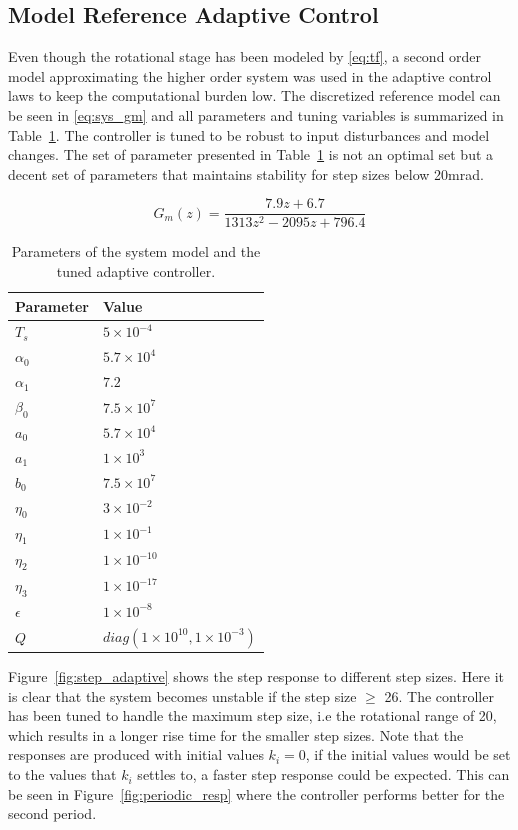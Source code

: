 \subsection{Model Reference Adaptive Control}
Even though the rotational stage has been modeled by \eqref{eq:tf}, a second order model approximating the higher order system was used in the adaptive control laws to keep the computational burden low. The discretized reference model can be seen in \eqref{eq:sys_gm} and all parameters and tuning variables is summarized in Table~\ref{tab:adaptive_param}. The controller is tuned to be robust to input disturbances and model changes. The set of parameter presented in Table~\ref{tab:adaptive_param} is not an optimal set but a decent set of parameters that maintains stability for step sizes below 20mrad.

\begin{equation}
  \label{eq:sys_gm}
  G_m(z) = \frac{7.9z + 6.7}{1313z^{2} - 2095z + 796.4}
\end{equation}

\begin{table}[h!]
  \centering
  \begin{tabular}{| l | l |}
    \hline
    Parameter & Value \\ \hline
    $T_s$ & $5 \times 10^{-4}$ \\
    $\alpha_0$ & $5.7 \times 10^{4}$ \\
    $\alpha_1$ & $7.2$ \\
    $\beta_0$ & $7.5 \times 10^{7}$ \\
    $a_0$ & $5.7 \times 10^{4}$ \\
    $a_1$ & $1 \times 10^{3}$ \\
    $b_0$ & $7.5 \times 10^{7}$ \\
    $\eta_0$ & $3 \times 10^{-2}$ \\
    $\eta_1$ & $1 \times 10^{-1}$ \\
    $\eta_2$ & $1 \times 10^{-10}$ \\
    $\eta_3$ & $1 \times 10^{-17}$ \\
    $\epsilon$ & $1 \times 10^{-8}$ \\
    $Q$ & $diag(1 \times 10^{10}, 1 \times 10^{-3})$\\
    \hline
  \end{tabular}
  \caption{\label{tab:adaptive_param} Parameters of the system model and the tuned adaptive controller.}
\end{table}

Figure~\ref{fig:step_adaptive} shows the step response to different step sizes. Here it is clear that the system becomes unstable if the step size $\geq$ \unit{26}{\milli\radian}. The controller has been tuned to handle the maximum step size, i.e the rotational range of \unit{20}{\milli\radian}, which results in a longer rise time for the smaller step sizes. Note that the responses are produced with initial values $k_i = 0$, if the initial values would be set to the values that $k_i$ settles to, a faster step response could be expected. This can be seen in Figure~\ref{fig:periodic_resp} where the controller performs better for the second period.

